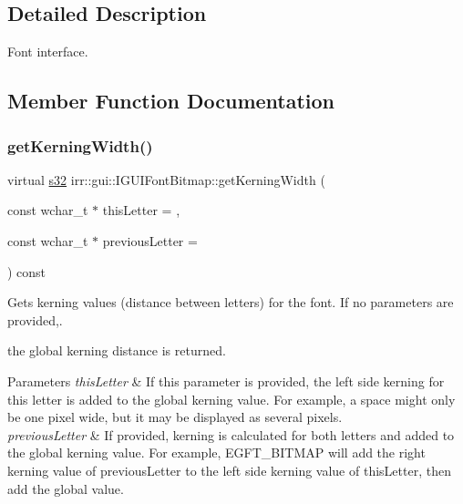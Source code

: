 \subsection{Detailed Description}
Font interface. 

\subsection{Member Function Documentation}
\mbox{\label{classirr_1_1gui_1_1IGUIFontBitmap_a7bdeaea45745a10e09f7769ec3b95a12}} 
\subsubsection{\texorpdfstring{get\+Kerning\+Width()}{getKerningWidth()}\hspace{0.1cm}{\footnotesize\ttfamily [1/2]}}
{\footnotesize\ttfamily virtual \hyperlink{namespaceirr_ac66849b7a6ed16e30ebede579f9b47c6}{s32} irr\+::gui\+::\+I\+G\+U\+I\+Font\+Bitmap\+::get\+Kerning\+Width (\begin{DoxyParamCaption}\item[{const wchar\+\_\+t $\ast$}]{this\+Letter = {},  }\item[{const wchar\+\_\+t $\ast$}]{previous\+Letter = {} }\end{DoxyParamCaption}) const\hspace{0.3cm}{\ttfamily [pure virtual]}}



Gets kerning values (distance between letters) for the font. If no parameters are provided,. 

the global kerning distance is returned. 
\begin{DoxyParams}{Parameters}
{\em this\+Letter} & If this parameter is provided, the left side kerning for this letter is added to the global kerning value. For example, a space might only be one pixel wide, but it may be displayed as several pixels. \\
\hline
{\em previous\+Letter} & If provided, kerning is calculated for both letters and added to the global kerning value. For example, E\+G\+F\+T\+\_\+\+B\+I\+T\+M\+AP will add the right kerning value of previous\+Letter to the left side kerning value of this\+Letter, then add the global value. \\
\hline
\end{DoxyParams}


